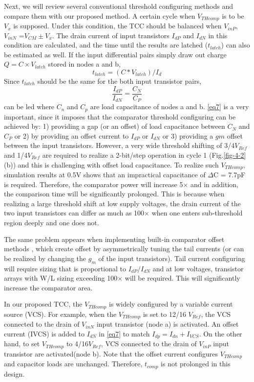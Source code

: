 Next, we will review several conventional threshold configuring methods and compare them with our proposed method. 
A certain cycle when $V_{THcomp}$ is to be $V_x$ is supposed. Under this condition, the TCC should be balanced when $V_{inP}$, $V_{inN}$ =$V_{CM} \pm V_x$. The drain current of input transistors $I_{dP}$ and $I_{dN}$ in this condition are calculated, and the time until the results are latched ($t_{latch}$) can also be estimated as well. If the input differential pairs simply draw out charge $Q = C \times V_{latch}$ stored in nodes a and b,
\begin{equation}
    t_{latch}=(C*V_{latch})/I_d
\end{equation}
Since $t_{latch}$ should be the same for the both input transistor pairs, 
\begin{equation}
\frac{I_{dP}}{I_{dN}} = \frac{C_N}{C_P}
\label{eq7}
\end{equation}
can be led where $C_n$ and $C_p$ are load capacitance of nodes a and b. 
\eqref{eq7} is a very important, since it imposes that the comparator threshold configuring can be achieved by: 1) providing a gap (or an offset) of load capacitance between $C_N$ and $C_P$ or 2) by providing an offset current to $I_{dP}$ or $I_{dN}$ or 3) providing a $gm$ offset between the input transistors. 
However, a very wide threshold shifting of 3/4$V_{Ref}$ and 1/4$V_{Ref}$ are required to realize a 2-bit/step operation in cycle 1 (Fig.\ref{fig-4-2}(b)) and this is challenging with offset load capacitance. To realize such $V_{THcomp}$, simulation results at 0.5V shows that an impractical capacitance of $\Delta$C = 7.7pF is required. Therefore, the comparator power will increase 5$\times$ and in addition, the comparison time will be significantly prolonged. This is because when realizing a large threshold shift at low supply voltages, the drain current of the two input transistors can differ as much as 100$\times$ when one enters sub-threshold region deeply and one does not. 

The same problem appears when implementing built-in comparator offset methods \cite{yoshioka-10b-50MS-SAR}, which create offset by asymmetrically tuning the tail currents (or can be realized by changing the $g_m$ of the input transistors). Tail current configuring will require sizing that is proportional to $I_{dP}/I_{dN}$ and at low voltages, transistor arrays with W/L sizing exceeding 100$\times$ will be required. This will significantly increase the comparator area.

In our proposed TCC, the $V_{THcomp}$ is widely configured by a variable current source (VCS). For example, when the $V_{THcomp}$ is set to 12/16 $V_{Ref}$, the VCS connected to the drain of $V_{inN}$ input transistor (node a) is activated. An offset current (IVCS) is added to $I_{dN}$ in \eqref{eq7} to match $I_{dp}=I_{dn}+I_{VCS}$. On the other hand, to set $V_{THcomp}$ to 4/16$V_{Ref}$, VCS connected to the drain of $V_{inP}$ input transistor are activated(node b). Note that the offset current configures $V_{THcomp}$ and capacitor loads are unchanged. Therefore, $t_{comp}$ is not prolonged in this design. 

